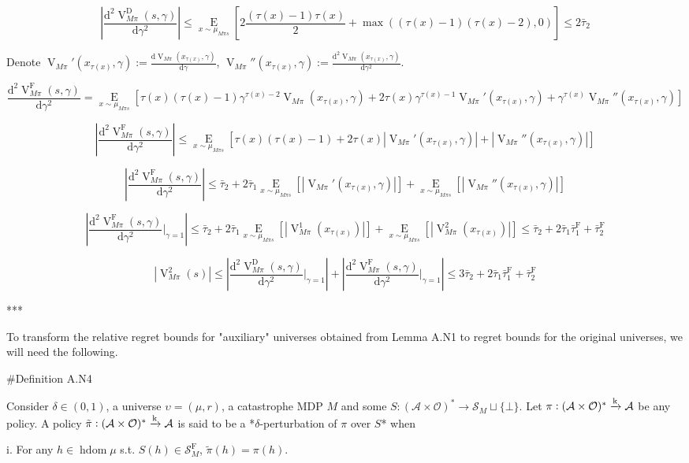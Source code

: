 \documentclass[a4paper]{article}
\newcommand{\AP}[1]{\left(#1\right)}
\newcommand{\AB}[1]{\left[#1\right]}
\newcommand{\Ea}[2]{\underset{#1}{\operatorname{E}}\AB{#2}}
\newcommand{\D}{\mathrm{d}}
\newcommand{\Abs}[1]{\left\vert #1 \right\vert}
\newcommand{\M}{\xrightarrow{\textnormal{k}}}
\newcommand{\Ob}{\mathcal{O}}
\newcommand{\A}{\mathcal{A}}
\newcommand{\St}{\mathcal{S}}
\newcommand{\FH}{(\A \times \Ob)^*}
\DeclareMathOperator{\HD}{hdom}
\newcommand{\RMD}{\mathrm{D}}
\newcommand{\RMF}{\mathrm{F}}
\newcommand{\SF}{\St^{\RMF}}
\newcommand{\V}{\operatorname{V}}
\begin{document}
$$\Abs{\frac{\D^2\V_{M\pi}^\RMD(s,\gamma)}{\D\gamma^2}} \leq \Ea{x\sim\mu_{M\pi s}}{2\frac{\AP{\tau(x)-1}\tau(x)}{2} + \max\AP{\AP{\tau(x)-1}\AP{\tau(x)-2},0}} \leq 2\bar{\tau}_2$$

Denote $\V_{M\pi}'\AP{x_{\tau(x)},\gamma}:=\frac{\D\V_{M\pi}\AP{x_{\tau(x)},\gamma}}{\D\gamma}$, $\V_{M\pi}''\AP{x_{\tau(x)},\gamma}:=\frac{\D^2\V_{M\pi}\AP{x_{\tau(x)},\gamma}}{\D\gamma^2}$.

$$\frac{\D^2\V_{M\pi}^\RMF(s,\gamma)}{\D\gamma^2} = \Ea{x\sim\mu_{M\pi s}}{\tau(x)\AP{\tau(x)-1}\gamma^{\tau(x)-2}\V_{M\pi}\AP{x_{\tau(x)},\gamma}+2\tau(x)\gamma^{\tau(x)-1}\V_{M\pi}'\AP{x_{\tau(x)},\gamma}+\gamma^{\tau(x)}\V_{M\pi}''\AP{x_{\tau(x)},\gamma}}$$

$$\Abs{\frac{\D^2\V_{M\pi}^\RMF(s,\gamma)}{\D\gamma^2}} \leq \Ea{x\sim\mu_{M\pi s}}{\tau(x)\AP{\tau(x)-1}+2\tau(x)\Abs{\V_{M\pi}'\AP{x_{\tau(x)},\gamma}}+\Abs{\V_{M\pi}''\AP{x_{\tau(x)},\gamma}}}$$

$$\Abs{\frac{\D^2\V_{M\pi}^\RMF(s,\gamma)}{\D\gamma^2}} \leq \bar{\tau}_2 + 2 \bar{\tau}_1 \Ea{x\sim\mu_{M\pi s}}{\Abs{\V_{M\pi}'\AP{x_{\tau(x)},\gamma}}}+\Ea{x\sim\mu_{M\pi s}}{\Abs{\V_{M\pi}''\AP{x_{\tau(x)},\gamma}}}$$

$$\Abs{\frac{\D^2\V_{M\pi}^\RMF(s,\gamma)}{\D\gamma^2}\bigg\vert_{\gamma=1}} \leq \bar{\tau}_2 + 2 \bar{\tau}_1 \Ea{x\sim\mu_{M\pi s}}{\Abs{\V_{M\pi}^1\AP{x_{\tau(x)}}}}+\Ea{x\sim\mu_{M\pi s}}{\Abs{\V_{M\pi}^2\AP{x_{\tau(x)}}}} \leq \bar{\tau}_2 + 2 \bar{\tau}_1 \bar{\tau}_1^\RMF +\bar{\tau}_2^\RMF$$

$$\Abs{\V_{M\pi}^2(s)} \leq \Abs{\frac{\D^2\V_{M\pi}^\RMD(s,\gamma)}{\D\gamma^2}\bigg\vert_{\gamma=1}}+\Abs{\frac{\D^2\V_{M\pi}^\RMF(s,\gamma)}{\D\gamma^2}\bigg\vert_{\gamma=1}} \leq 3 \bar{\tau}_2 + 2 \bar{\tau}_1 \bar{\tau}_1^\RMF +\bar{\tau}_2^\RMF$$

***

To transform the relative regret bounds for "auxiliary" universes obtained from Lemma A.N1 to regret bounds for the original universes, we will need the following.

\#Definition A.N4

Consider $\delta\in(0,1)$, a universe $\upsilon=(\mu,r)$, a catastrophe MDP $M$ and some $S: \FH \rightarrow \St_M \sqcup \{\bot\}$. Let $\pi: \FH \M \A$ be any policy. A policy $\tilde{\pi}: \FH \M \A$ is said to be a *$\delta$-perturbation of $\pi$ over $S$* when

i. For any $h \in \HD{\mu}$ s.t. $S(h)\in\SF_M$, $\tilde{\pi}(h)=\pi(h)$.
\end{document}
